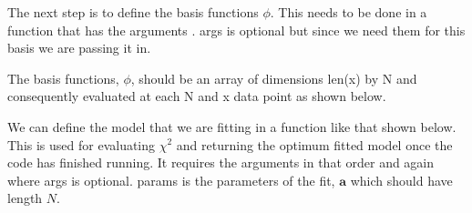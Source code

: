 \documentclass[letterpaper,10pt,english]{sphinxmanual}
\begin{document}
\begin{sphinxVerbatim}[commandchars=\\\{\}]
  \PYG{p}{[}\PYG{p}{[}\PYG{p}{]} \PYG{p}{[}\PYG{p}{]}\PYG{p}{]}
\end{sphinxVerbatim}

The next step is to define the basis functions \({\phi}\). This needs to be
done in a function that has the arguments . \textquotesingle{}args\textquotesingle{}
is optional but since we need them for this basis we are passing it in.

The basis functions, \({\phi}\), should be an array of dimensions len(x)
by N and consequently evaluated at each N and x data point as shown below.

\begin{sphinxVerbatim}[commandchars=\\\{\}]
     

      \PYG{p}{[} \PYG{p}{]}
       
           
            \PYG{p}{[} \PYG{p}{]}  \PYG{p}{[}\PYG{p}{]}\PYG{p}{[}\PYG{p}{]}\PYG{p}{[}\PYG{p}{]}

     
\end{sphinxVerbatim}

We can define the model that we are fitting in a function like that shown below.
This is used for evaluating \({\chi^2}\) and returning the optimum fitted model
once the code has finished running. It requires the arguments
 in that order and again where \textquotesingle{}args\textquotesingle{} is optional.
\textquotesingle{}params\textquotesingle{} is the parameters of the fit, \({\mathbf{a}}\) which should have length
\({N}\).
\end{document}
